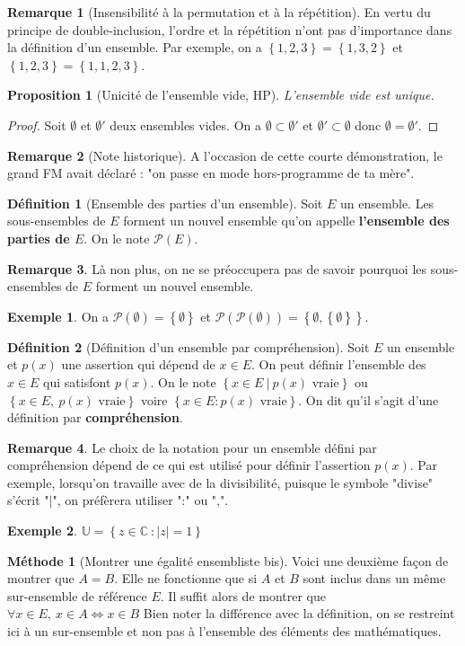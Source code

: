 \documentclass[french]{book}
\newcommand{\C}{\mathbb{C}}
\newcommand{\U}{\mathbb{U}}
\theoremstyle{plain}
\newtheorem{prop}{Proposition}[chapter]
\theoremstyle{definition}
\newtheorem{dfn}{Définition}[chapter]
\newtheorem{exa}{Exemple}[chapter]
\newtheorem{rmq}{Remarque}[chapter]
\newtheorem{met}{Méthode}[chapter]
\theoremstyle{remark}
\begin{document}
\begin{rmq}[Insensibilité à la permutation et à la répétition]
	En vertu du principe de double-inclusion, l'ordre et la répétition n'ont pas d'importance dans la définition d'un ensemble. Par exemple, on a $\left\{1,2,3\right\}=\left\{1,3,2\right\}$ et $\left\{1,2,3\right\}=\left\{1,1,2,3\right\}$.
\end{rmq}
\begin{prop}[Unicité de l'ensemble vide, HP]
	L'ensemble vide est unique.
\end{prop}
\begin{proof}
	Soit $\emptyset$ et $\emptyset'$ deux ensembles vides. On a $\emptyset\subset\emptyset'$ et $\emptyset'\subset\emptyset$ donc $\emptyset=\emptyset'$.
\end{proof}
\begin{rmq}[Note historique]
	A l'occasion de cette courte démonstration, le grand FM avait déclaré : "on passe en mode hors-programme de ta mère".
\end{rmq}
\begin{dfn}[Ensemble des parties d'un ensemble]
	Soit $E$ un ensemble. Les sous-ensembles de $E$ forment un nouvel ensemble qu'on appelle \textbf{l'ensemble des parties de $E$}. On le note $\mathcal{P}(E)$.
\end{dfn}
\begin{rmq}
	Là non plus, on ne se préoccupera pas de savoir pourquoi les sous-ensembles de $E$ forment un nouvel ensemble.
\end{rmq}
\begin{exa}
	On a $\mathcal{P}(\emptyset)=\left\{\emptyset\right\}$ et $\mathcal{P}(\mathcal{P}(\emptyset))=\left\{\emptyset,\left\{\emptyset\right\}\right\}$.
\end{exa}
\begin{dfn}[Définition d'un ensemble par compréhension]
	Soit $E$ un ensemble et $p(x)$ une assertion qui dépend de $x\in E$. On peut définir l'ensemble des $x\in E$ qui satisfont $p(x)$. On le note $\left\{x\in E\ | \ p(x)\text{ vraie}\right\}$ ou $\left\{x\in E,\ p(x)\text{ vraie}\right\}$ voire $\left\{x\in E : p(x)\text{ vraie}\right\}$. On dit qu'il s'agit d'une définition par \textbf{compréhension}.
\end{dfn}
\begin{rmq}
	Le choix de la notation pour un ensemble défini par compréhension dépend de ce qui est utilisé pour définir l'assertion $p(x)$. Par exemple, lorsqu'on travaille avec de la divisibilité, puisque le symbole "divise" s'écrit "$\mid$", on préfèrera utiliser ":" ou ",".
\end{rmq}
\begin{exa}
	$\U=\left\{z\in\C\ : \lvert z\rvert=1\right\}$
\end{exa}
\begin{met}[Montrer une égalité ensembliste bis]
	Voici une deuxième façon de montrer que $A=B$. Elle ne fonctionne que si $A$ et $B$ sont inclus dans un même sur-ensemble de référence $E$. Il suffit alors de montrer que $\forall x\in E,\ x\in A\iff x\in B$ Bien noter la différence avec la définition, on se restreint ici à un sur-ensemble et non pas à l'ensemble des éléments des mathématiques.
\end{met}
\end{document}
